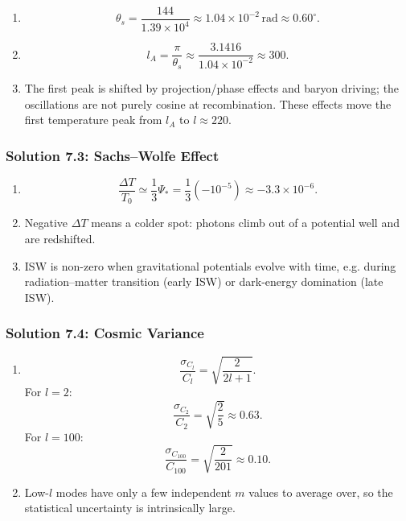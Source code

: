 \begin{enumerate}[label=(\alph*)]
  \item
  \[
    \theta_s = \frac{144}{1.39\times10^4} \approx 1.04\times10^{-2}\,\mathrm{rad}
    \approx 0.60^\circ.
  \]

  \item
  \[
    l_A = \frac{\pi}{\theta_s} \approx \frac{3.1416}{1.04\times10^{-2}} \approx 300.
  \]

  \item The first peak is shifted by projection/phase effects and baryon driving; the oscillations
  are not purely cosine at recombination. These effects move the first temperature peak from
  $l_A$ to $l\approx 220$.
\end{enumerate}

\subsubsection*{Solution 7.3: Sachs--Wolfe Effect}

\begin{enumerate}[label=(\alph*)]
  \item
  \[
    \frac{\Delta T}{T_0} \simeq \frac{1}{3}\Psi_* = \frac{1}{3}(-10^{-5})\approx -3.3\times10^{-6}.
  \]

  \item Negative $\Delta T$ means a colder spot: photons climb out of a potential well and are
  redshifted.

  \item ISW is non-zero when gravitational potentials evolve with time, e.g. during radiation--matter
  transition (early ISW) or dark-energy domination (late ISW).
\end{enumerate}

\subsubsection*{Solution 7.4: Cosmic Variance}

\begin{enumerate}[label=(\alph*)]
  \item
  \[
    \frac{\sigma_{C_l}}{C_l} = \sqrt{\frac{2}{2l+1}}.
  \]
  For $l=2$:
  \[
    \frac{\sigma_{C_2}}{C_2}=\sqrt{\frac{2}{5}}\approx 0.63.
  \]
  For $l=100$:
  \[
    \frac{\sigma_{C_{100}}}{C_{100}}=\sqrt{\frac{2}{201}}\approx 0.10.
  \]

  \item Low-$l$ modes have only a few independent $m$ values to average over, so the statistical
  uncertainty is intrinsically large.
\end{enumerate}
